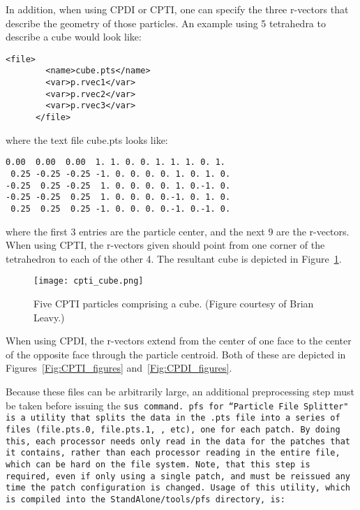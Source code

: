 In addition, when using CPDI or CPTI, one can specify the three r-vectors that
describe the geometry of those particles.  An example using 5 tetrahedra to
describe a cube would look like:

\begin{Verbatim}[fontsize=\footnotesize]
      <file>
        <name>cube.pts</name>
        <var>p.rvec1</var>
        <var>p.rvec2</var>
        <var>p.rvec3</var>
      </file>
\end{Verbatim}

where the text file cube.pts looks like:

\begin{Verbatim}[fontsize=\footnotesize]
 0.00  0.00  0.00  1. 1. 0. 0. 1. 1. 1. 0. 1.
 0.25 -0.25 -0.25 -1. 0. 0. 0. 0. 1. 0. 1. 0.
-0.25  0.25 -0.25  1. 0. 0. 0. 0. 1. 0.-1. 0.
-0.25 -0.25  0.25  1. 0. 0. 0. 0.-1. 0. 1. 0.
 0.25  0.25  0.25 -1. 0. 0. 0. 0.-1. 0.-1. 0.
\end{Verbatim}
where the first 3 entries are the particle center, and the next 9 are the
r-vectors.  When using CPTI, the r-vectors given should point from one
corner of the tetrahedron to each of the other 4.  The resultant cube
is depicted in Figure~\ref{Fig:cpti_cube}.

\begin{figure}
\centering
  \texttt{[image: cpti\_cube.png]}
  \caption{Five CPTI particles comprising a cube. (Figure courtesy of Brian Leavy.)}
  \label{Fig:cpti_cube}
\end{figure}
When using CPDI, the
r-vectors extend from the center of one face to the center of the opposite
face through the particle centroid.  Both of these are depicted in
Figures~\ref{Fig:CPTI_figures} and~\ref{Fig:CPDI_figures}.

Because these files can be arbitrarily large, an additional preprocessing step
must be taken before issuing the \tt sus \normalfont command.
\tt pfs \normalfont for ``Particle File Splitter" is a utility that splits the
data in the \tt .pts \normalfont file into a series of files
(\tt file.pts.0, file.pts.1, \normalfont, etc), one for each
patch.  By doing this, each processor needs only read in the data for the
patches that it contains, rather than each processor reading in the entire file,
which can be hard on the file system.  Note, that this step is required,
even if only using a single patch, and must be reissued any time the patch
configuration is changed.  Usage of this utility, which is compiled
into the \tt StandAlone/tools/pfs \normalfont directory, is:

